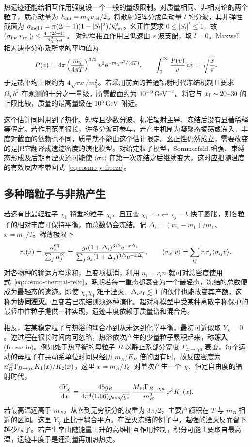 热遗迹还能给相互作用强度设一个一般的量级限制。对质量相同、非相对论的两个粒子，质心动量为 $k_{\rm cm}=m_\chi v_{\rm rel}/2$。将散射矩阵分成角动量 $l$ 的分波，其非弹性截面为 $\sigma_{{\rm inel},l}=\pi(2l+1)(1-|S_l|^2)/k_{\rm cm}^2$。幺正性要求 $0\leq|S_l|^2\leq1$，故 $(\sigma_{\rm inel}v_{\rm rel})_l\leq \frac{4\pi(2l+1)}{m_\chi^2v_{\rm rel}}$。
对短程相互作用且低速由 $s$ 波支配，取 $l=0$。Maxwell 相对速率分布及所求的平均值为
\[
 P(v)=4\pi\left(\frac{m_\chi}{4\pi T}\right)^{3/2}v^2
       \mathrm{e}^{-m_\chi v^2/(4T)},\qquad
 \int_0^\infty\frac{P(v)}v\,\dd v=\sqrt{\frac{x}{\pi}} .
\]
于是热平均上限约为 $4\sqrt{\pi x}/m_\chi^2$。若采用前面的普通辐射时代冻结机制且要求 $\Omega_\chi h^2$ 在观测的十分之一量级，所需截面约为 $10^{-9}\,{\rm GeV}^{-2}$。将它与 $x_{\rm f}\sim20$--$30$ 的上限比较，质量的最高量级在 $10^5\,{\rm GeV}$ 附近。

这个估计同时用到了热化、短程且少数分波、标准辐射主导、冻结后没有显著稀释等假定。若作用范围很长，许多分波可参与，若产生机制为凝聚态振荡或冻入，丰度对截面的依赖也不同，质量就不能由这个估计限定。幺正性仍然成立，需要改变的是把它翻译成遗迹密度的演化模型。对给定粒子模型，Sommerfeld 增强、束缚态形成及后期再湮灭还可能使 $\langle\sigma v\rangle$ 在第一次冻结之后继续变大，这时应把随温度的有效反应率带回式~\eqref{eq:cosmo-y-freeze}。

\subsection{多种暗粒子与非热产生}

若还有比最轻粒子 $\chi_1$ 稍重的粒子 $\chi_i$，且互变 $\chi_i+a\rightleftharpoons\chi_j+b$ 快于膨胀，则各粒子的相对丰度可保持平衡，而总数仍会冻结。记 $\Delta_i=(m_i-m_1)/m_1$、$x=m_1/T$。稀薄极限下
\[
 r_i(x)=\frac{n_i^{\rm eq}}{\sum_j n_j^{\rm eq}}
 =\frac{g_i(1+\Delta_i)^{3/2}\mathrm{e}^{-x\Delta_i}}
 {\sum_jg_j(1+\Delta_j)^{3/2}\mathrm{e}^{-x\Delta_j}},\qquad
 \langle\sigma_{\rm eff}v\rangle=\sum_{ij}r_i r_j\langle\sigma_{ij}v\rangle .
\]
对各物种的输运方程求和，互变项抵消，利用 $n_i=r_i n$ 就可对总密度使用式~\eqref{eq:cosmo-thermal-relic}。晚期若每一重态都衰变为一个最轻态，冻结的总数便成为最轻态的遗迹。即使 $\chi_1\chi_1$ 难于湮灭，$\Delta_i x_{\rm f}\lesssim1$ 的伙伴也能改变其产额，这称为\textbf{协同湮灭}。互变若已冻结则须逐种演化。超对称模型中受某种离散宇称保护的最轻中性粒子提供一种实现，遗迹丰度依赖于质量谱和混合角。

相反，若某稳定粒子与热浴的耦合小到从未达到化学平衡，最初可近似取 $Y_\chi=0$。逆过程在很长时间内可忽略，热浴依次产生的少量粒子累积起来，称\textbf{冻入}(freeze-in)。例如处于热平衡的母粒子 $B$ 以静止系部分宽度 $\Gamma_{B\to\chi a}$ 衰变。每个运动的母粒子在共动系单位时间只经历 $m_B/E_B$ 倍的固有时，故反应密度为 $n_B^{\rm eq}\Gamma_{B\to\chi a}K_1(x)/K_2(x)$，这里 $x=m_B/T$。对单次产生一个 $\chi$、恒定自由度的辐射时代，
\[
 \frac{\dd Y_\chi}{\dd x}=
 \frac{45g_B}{4\pi^4(1.66)g_{*s}\sqrt{g_*}}\,
 \frac{M_{\rm Pl}\Gamma_{B\to\chi a}}{m_B^2}\,x^3 K_1(x).
\]
若最高温远高于 $m_B$，从零到无穷积分的权重为 $3\pi/2$，主要产额积在 $T$ 与 $m_B$ 相近的区间。这里 $Y_\chi$ 正比于耦合平方。在湮灭冻结的例子中，越强的湮灭反而留下越少粒子。若产生率由随能量上升的高维相互作用控制，积分可能主要取自最高温，遗迹丰度于是还测量再加热热史。

